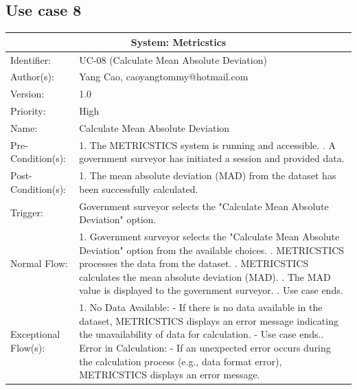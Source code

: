 
\begin{table}[h]
\subsection*{Use case 8}
\begin{tabular}{ | p{4cm} | p{10cm} | }
 \hline
 \multicolumn{2}{|c|}{System: Metricstics} \\
 \hline
 Identifier: & UC-08 (Calculate Mean Absolute Deviation)  \\
 \hline
 Author(s): & Yang Cao, caoyangtommy@hotmail.com    \\
 \hline
 Version: & 1.0	\\
 \hline
 Priority: & High	\\
 \hline
 Name: & Calculate Mean Absolute Deviation   \\
 \hline
 Pre-Condition(s):  & {1. The METRICSTICS system is running and accessible. \newline 2. A government surveyor has initiated a session and provided data.  }\\
 \hline
 Post-Condition(s):  & {1. The mean absolute deviation (MAD) from the dataset has been successfully calculated.  }\\
 \hline
 Trigger: & Government surveyor selects the "Calculate Mean Absolute Deviation" option.  \\
 \hline
 Normal Flow:  & {1. Government surveyor selects the "Calculate Mean Absolute Deviation" option from the available choices. \newline 2. METRICSTICS processes the data from the dataset. \newline 3. METRICSTICS calculates the mean absolute deviation (MAD). \newline 4. The MAD value is displayed to the government surveyor. \newline 5. Use case ends.}\\
 \hline
 Exceptional Flow(s):  & {1. No Data Available: \newline
   - If there is no data available in the dataset, METRICSTICS displays an error message indicating the unavailability of data for calculation.\newline
   - Use case ends.\newline
   2. Error in Calculation: \newline
   - If an unexpected error occurs during the calculation process (e.g., data format error), METRICSTICS displays an error message. \newline
}
\end{tabular}
\end{table}

